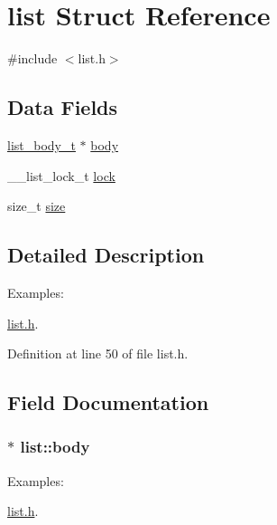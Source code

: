 \hypertarget{structlist}{\section{list Struct Reference}
\label{structlist}
}


{\ttfamily \#include $<$list.\+h$>$}

\subsection*{Data Fields}
\begin{DoxyCompactItemize}
\item 
\hyperlink{list_8h_a26009b16c17e2336df1025f49f3ebd7e}{list\+\_\+body\+\_\+t} $\ast$ \hyperlink{structlist_a86cadf6e44fd6505728c5149b336d3db}{body}
\item 
\+\_\+\+\_\+list\+\_\+lock\+\_\+t \hyperlink{structlist_a59893e59e3f090a886894244b0dc0643}{lock}
\item 
size\+\_\+t \hyperlink{structlist_ae581be90bd8eb7051528b61ad216de88}{size}
\end{DoxyCompactItemize}


\subsection{Detailed Description}
\begin{Desc}
\item[Examples\+: ]\par
\hyperlink{list_8h-example}{list.\+h}.\end{Desc}


Definition at line 50 of file list.\+h.



\subsection{Field Documentation}
\hypertarget{structlist_a86cadf6e44fd6505728c5149b336d3db}{
\subsubsection[{body}]{$\ast$ list\+::body}}\label{structlist_a86cadf6e44fd6505728c5149b336d3db}
\begin{Desc}
\item[Examples\+: ]\par
\hyperlink{list_8h-example}{list.\+h}.\end{Desc}


